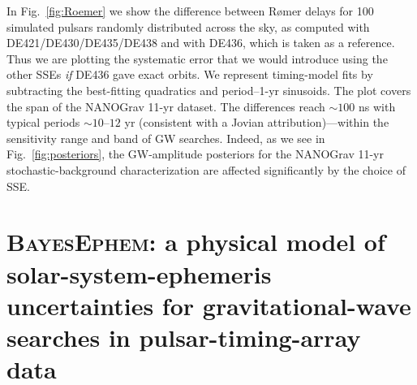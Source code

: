 \documentclass{aastex63}
\begin{document}
In Fig.\ \ref{fig:Roemer} we show the difference between R{\o}mer delays for 100 simulated pulsars randomly distributed across the sky, as computed with DE421/DE430/DE435/DE438 and with DE436, which is taken as a reference. Thus we are plotting the systematic error that we would introduce using the other SSEs \emph{if} DE436 gave exact orbits. We represent timing-model fits by subtracting the best-fitting quadratics and period--1-yr sinusoids. The plot covers the span of the NANOGrav 11-yr dataset.
The differences reach $\sim 100$ ns with typical periods $\sim 10$--$12$ yr (consistent with a Jovian attribution)---within the sensitivity range and band of GW searches. Indeed, as we see in Fig.\ \ref{fig:posteriors}, the GW-amplitude posteriors for the NANOGrav 11-yr stochastic-background characterization are affected significantly by the choice of SSE.

\section{\textsc{BayesEphem}: a physical model of solar-system-ephemeris uncertainties for gravitational-wave searches in pulsar-timing-array data}
\label{sec:physical}
\end{document}
